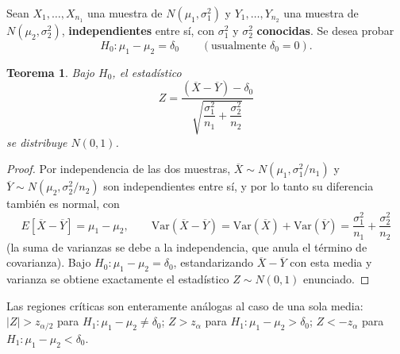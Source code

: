 \documentclass[11pt,a4paper]{article}
\theoremstyle{plain}
\newtheorem{teorema}{Teorema}[section]
\theoremstyle{definition}
\theoremstyle{remark}
\begin{document}
Sean $X_1,\dots,X_{n_1}$ una muestra de $N(\mu_1,\sigma_1^2)$ y $Y_1,\dots,Y_{n_2}$ una muestra de $N(\mu_2,\sigma_2^2)$, \textbf{independientes} entre sí, con $\sigma_1^2$ y $\sigma_2^2$ \textbf{conocidas}. Se desea probar
\[
H_0:\mu_1-\mu_2=\delta_0 \qquad (\text{usualmente } \delta_0=0).
\]

\begin{teorema}
Bajo $H_0$, el estadístico
\[
Z=\frac{(\overline X-\overline Y)-\delta_0}{\sqrt{\dfrac{\sigma_1^2}{n_1}+\dfrac{\sigma_2^2}{n_2}}}
\]
se distribuye $N(0,1)$.
\end{teorema}

\begin{proof}
Por independencia de las dos muestras, $\overline X\sim N(\mu_1,\sigma_1^2/n_1)$ y $\overline Y\sim N(\mu_2,\sigma_2^2/n_2)$ son independientes entre sí, y por lo tanto su diferencia también es normal, con
\[
E[\overline X-\overline Y]=\mu_1-\mu_2, \qquad \text{Var}(\overline X-\overline Y)=\text{Var}(\overline X)+\text{Var}(\overline Y)=\frac{\sigma_1^2}{n_1}+\frac{\sigma_2^2}{n_2}
\]
(la suma de varianzas se debe a la independencia, que anula el término de covarianza). Bajo $H_0:\mu_1-\mu_2=\delta_0$, estandarizando $\overline X-\overline Y$ con esta media y varianza se obtiene exactamente el estadístico $Z\sim N(0,1)$ enunciado.
\end{proof}

Las regiones críticas son enteramente análogas al caso de una sola media: $|Z|>z_{\alpha/2}$ para $H_1:\mu_1-\mu_2\neq\delta_0$; $Z>z_\alpha$ para $H_1:\mu_1-\mu_2>\delta_0$; $Z<-z_\alpha$ para $H_1:\mu_1-\mu_2<\delta_0$.
\end{document}
